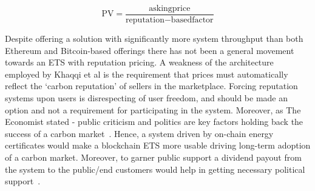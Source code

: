 \begin{equation}
    \text{PV} =
    \frac{\text{askingprice}}
    {\text{reputation} - \text{basedfactor}}
    \label{eqn:pv}
\end{equation}

Despite offering a solution with significantly more
system throughput than both Ethereum and Bitcoin-based offerings
there has not been a general movement towards
an ETS with reputation pricing. A weakness of the
architecture employed by Khaqqi et al is the requirement that
prices must automatically reflect the `carbon reputation' of
sellers in the marketplace. Forcing reputation systems
upon users is disrespecting of user freedom, and
should be made an option and not a requirement for
participating in the system. Moreover, as The Economist
stated - public criticism and politics are key factors holding
back the success of a carbon market~\cite{EconE}. Hence,
a system driven by on-chain energy certificates would make
a blockchain ETS more usable driving long-term adoption of a
carbon market. Moreover, to garner public support a dividend
payout from the system to the public/end customers would help in
getting necessary political support~\cite{EconE}.